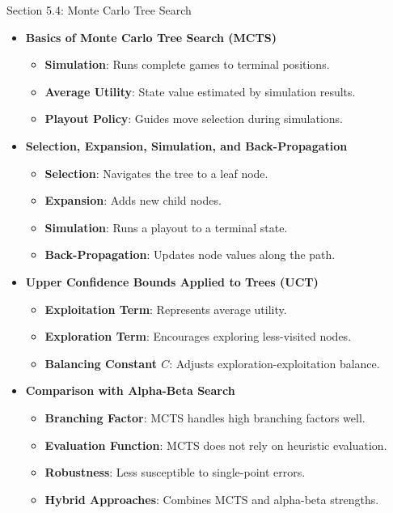 \begin{notes}{Section 5.4: Monte Carlo Tree Search}
\begin{highlight}
        \begin{itemize}
            \item \textbf{Basics of Monte Carlo Tree Search (MCTS)}
                \begin{itemize}
                    \item \textbf{Simulation}: Runs complete games to terminal positions.
                    \item \textbf{Average Utility}: State value estimated by simulation results.
                    \item \textbf{Playout Policy}: Guides move selection during simulations.
                \end{itemize}
            \item \textbf{Selection, Expansion, Simulation, and Back-Propagation}
                \begin{itemize}
                    \item \textbf{Selection}: Navigates the tree to a leaf node.
                    \item \textbf{Expansion}: Adds new child nodes.
                    \item \textbf{Simulation}: Runs a playout to a terminal state.
                    \item \textbf{Back-Propagation}: Updates node values along the path.
                \end{itemize}
            \item \textbf{Upper Confidence Bounds Applied to Trees (UCT)}
                \begin{itemize}
                    \item \textbf{Exploitation Term}: Represents average utility.
                    \item \textbf{Exploration Term}: Encourages exploring less-visited nodes.
                    \item \textbf{Balancing Constant \( C \)}: Adjusts exploration-exploitation balance.
                \end{itemize}
            \item \textbf{Comparison with Alpha-Beta Search}
                \begin{itemize}
                    \item \textbf{Branching Factor}: MCTS handles high branching factors well.
                    \item \textbf{Evaluation Function}: MCTS does not rely on heuristic evaluation.
                    \item \textbf{Robustness}: Less susceptible to single-point errors.
                    \item \textbf{Hybrid Approaches}: Combines MCTS and alpha-beta strengths.
                \end{itemize}
        \end{itemize}
    \end{highlight}
\end{notes}

